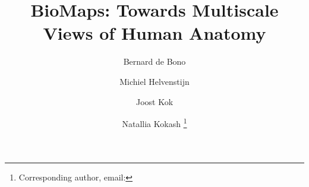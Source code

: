 \documentclass[runningheads]{llncs}
\begin{document}
\title{BioMaps: Towards Multiscale Views of Human Anatomy}

\author{
  Bernard de Bono
  \and
  Michiel Helvenstijn
  \and 	
  Joost Kok
  \and
  Natallia Kokash
  \fnmsep
  \thanks{Corresponding author, email: }
}


\maketitle

\begin{abstract}
\end{abstract}









\end{document}
